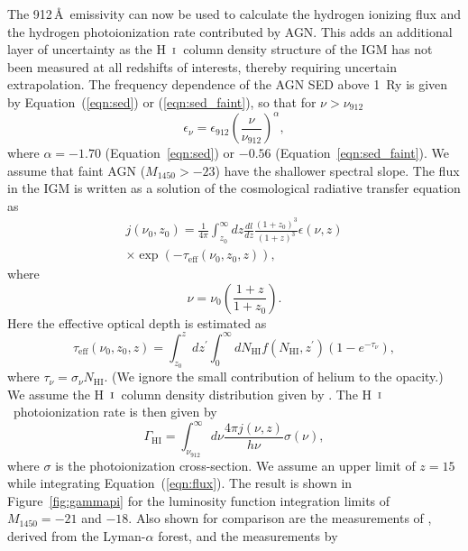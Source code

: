 \documentclass[fleqn,usenatbib]{mnras}
\def\HI{\hbox{H~$\scriptstyle\rm I$}}
\begin{document}
The 912\,\AA\ emissivity can now be used to calculate the hydrogen
ionizing flux and the hydrogen photoionization rate contributed by
AGN.  This adds an additional layer of uncertainty as the \HI\ column
density structure of the IGM has not been measured at all redshifts of
interests, thereby requiring uncertain extrapolation.  The frequency
dependence of the AGN SED above 1~Ry is given by
Equation~(\ref{eqn:sed}) or (\ref{eqn:sed_faint}), so that for $\nu >
\nu_{912}$
\begin{equation}
  \epsilon_\nu = \epsilon_{912}\left(\frac{\nu}{\nu_{912}}\right)^\alpha,
  \label{eqn:epsilon_freq}
\end{equation}
where $\alpha=-1.70$ (Equation~\ref{eqn:sed}) or $-0.56$
(Equation~\ref{eqn:sed_faint}).  We assume that faint AGN
($M_{1450}>-23$) have the shallower spectral slope.  The flux in the
IGM is written as a solution of the cosmological radiative transfer
equation as \citep{2012ApJ...746..125H}
\begin{multline}
  j(\nu_0, z_0)=\frac{1}{4\pi}\int_{z_0}^\infty dz\frac{dl}{dz}
  \frac{(1+z_0)^3}{(1+z)^3}\epsilon(\nu,z)\\
  \times\exp{(-\tau_\mathrm{eff}(\nu_0, z_0, z))},
  \label{eqn:flux}
\end{multline}
where
\begin{equation}
  \nu = \nu_0\left(\frac{1+z}{1+z_0}\right).
\end{equation}
Here the effective optical depth is estimated as
\begin{equation}
  \tau_\mathrm{eff}(\nu_0, z_0, z) = \int_{z_0}^z dz^\prime\int_0^\infty
  dN_\mathrm{HI} f(N_\mathrm{HI}, z^\prime) (1-e^{-\tau_\nu}),
\end{equation}
where $\tau_\nu=\sigma_\nu N_\mathrm{HI}$.  (We ignore the small
contribution of helium to the opacity.)  We assume the \HI\ column
density distribution given by \citet{2012ApJ...746..125H}.  The
\HI\ photoionization rate is then given by
\begin{equation}
  \Gamma_\mathrm{HI}=\int_{\nu_{912}}^\infty d\nu
  \frac{4\pi j(\nu,z)}{h\nu} \sigma(\nu),
\end{equation}
where $\sigma$ is the photoionization cross-section.  We assume an
upper limit of $z=15$ while integrating Equation~(\ref{eqn:flux}).
The result is shown in Figure~\ref{fig:gammapi} for the luminosity
function integration limits of $M_{1450}=-21$ and $-18$.  Also shown
for comparison are the measurements of \citet{2013MNRAS.436.1023B},
derived from the Lyman-$\alpha$ forest, and the measurements by
\end{document}
